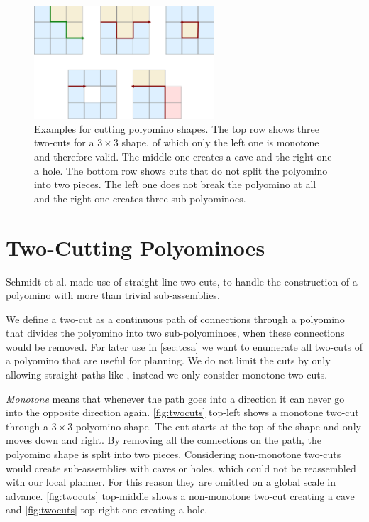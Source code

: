 \begin{figure}
	\centering
	\includegraphics[width=0.6\textwidth]{figures/twocuts.pdf}
	\caption[Different cuts for polyomino shapes]{Examples for cutting polyomino shapes. The top row shows three two-cuts for a $3\times3$ shape, of which only the left one is monotone and therefore valid. The middle one creates a cave and the right one a hole. The bottom row shows cuts that do not split the polyomino into two pieces. The left one does not break the polyomino at all and the right one creates three sub-polyominoes.}
	\label{fig:twocuts}
\end{figure}


\section{Two-Cutting Polyominoes}
\label{sec:twocutting}

Schmidt et al. \cite{Schmidt2018} made use of straight-line two-cuts, to handle the construction of a polyomino with more than trivial sub-assemblies.

We define a two-cut as a continuous path of connections through a polyomino that divides the polyomino into two sub-polyominoes, when these connections would be removed.
For later use in \autoref{sec:tcsa} we want to enumerate all two-cuts of a polyomino that are useful for planning.
We do not limit the cuts by only allowing straight paths like \cite{Schmidt2018}, instead we only consider monotone two-cuts.

\textit{Monotone} means that whenever the path goes into a direction it can never go into the opposite direction again.
\autoref{fig:twocuts} top-left shows a monotone two-cut through a $3\times3$ polyomino shape.
The cut starts at the top of the shape and only moves down and right.
By removing all the connections on the path, the polyomino shape is split into two pieces.
Considering non-monotone two-cuts would create sub-assemblies with caves or holes, which could not be reassembled with our local planner.
For this reason they are omitted on a global scale in advance.
\autoref{fig:twocuts} top-middle shows a non-monotone two-cut creating a cave and \autoref{fig:twocuts} top-right one creating a hole.

